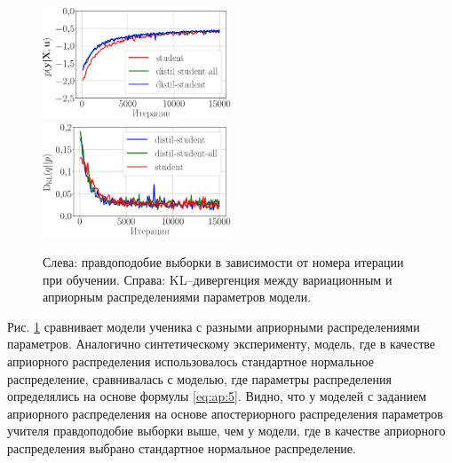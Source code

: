 \begin{figure}[h!]
\includegraphics[width=0.5\textwidth]{results/bayesdistil/fashionmnist_likelihood_2_layers.eps}
\includegraphics[width=0.5\textwidth]{results/bayesdistil/fashionmnist_D_KL_2_layers.eps}
\caption{Слева: правдоподобие выборки в зависимости от номера итерации при обучении. Справа: KL--дивергенция между вариационным и априорным распределениями параметров модели.}
\label{exp:fig3}
\end{figure}

Рис. \ref{exp:fig3} сравнивает модели ученика с разными априорными распределениями параметров.
Аналогично синтетическому эксперименту, модель, где в качестве априорного распределения использовалось стандартное нормальное распределение, сравнивалась с моделью, где параметры распределения определялись на основе формулы \eqref{eq:ap:5}. Видно, что у моделей с заданием априорного распределения на основе апостериорного распределения параметров учителя правдоподобие выборки выше, чем у модели, где в качестве априорного распределения выбрано стандартное нормальное распределение.

